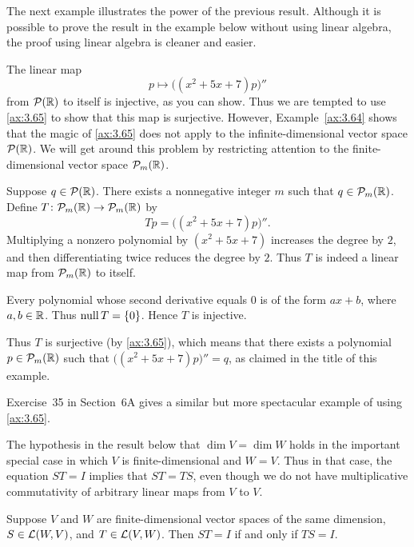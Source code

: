 The next example illustrates the power of the previous result. Although it is
possible to prove the result in the example below without using linear algebra,
the proof using linear algebra is cleaner and easier.

\begin{example}[There exists a polynomial $p$ such that
$\bigl((x^2+5x+7)p\bigr)''=q$]\label{ax:3.67}
The linear map
\[ p \mapsto \bigl((x^2+5x+7)p\bigr)'' \]
from $\mathcal{P}(\mathbb{R})$ to itself is injective, as you can show. Thus we are tempted
to use \ref{ax:3.65} to show that this map is surjective. However,
Example~\ref{ax:3.64} shows that the magic of \ref{ax:3.65} does not apply to
the infinite-dimensional vector space $\mathcal{P}(\mathbb{R})$. We will get around this
problem by restricting attention to the finite-dimensional vector space
$\mathcal{P}_m(\mathbb{R})$.

Suppose $q\in\mathcal{P}(\mathbb{R})$. There exists a nonnegative integer $m$ such that
$q\in\mathcal{P}_m(\mathbb{R})$. Define $T\colon\mathcal{P}_m(\mathbb{R})\to\mathcal{P}_m(\mathbb{R})$ by
\[ Tp = \bigl((x^2+5x+7)p\bigr)''. \]
Multiplying a nonzero polynomial by $(x^2+5x+7)$ increases the degree by $2$,
and then differentiating twice reduces the degree by $2$. Thus $T$ is indeed a
linear map from $\mathcal{P}_m(\mathbb{R})$ to itself.

Every polynomial whose second derivative equals $0$ is of the form $ax+b$,
where $a,b\in\mathbb{R}$. Thus $\operatorname{null} T=\{0\}$. Hence $T$ is injective.

Thus $T$ is surjective (by \ref{ax:3.65}), which means that there exists a
polynomial $p\in\mathcal{P}_m(\mathbb{R})$ such that $\bigl((x^2+5x+7)p\bigr)''=q$, as
claimed in the title of this example.
\end{example}

Exercise~35 in Section~6A gives a similar but more spectacular example of using
\ref{ax:3.65}.

The hypothesis in the result below that $\dim V=\dim W$ holds in the important
special case in which $V$ is finite-dimensional and $W=V$. Thus in that case,
the equation $ST=I$ implies that $ST=TS$, even though we do not have
multiplicative commutativity of arbitrary linear maps from $V$ to $V$.

\begin{result}[$ST=I \iff TS=I$ (on vector spaces of the same
dimension)]\label{ax:3.68}
Suppose $V$ and $W$ are finite-dimensional vector spaces of the same dimension,
$S\in\mathcal{L}(W,V)$, and $T\in\mathcal{L}(V,W)$. Then $ST=I$ if and only if $TS=I$.
\end{result}

